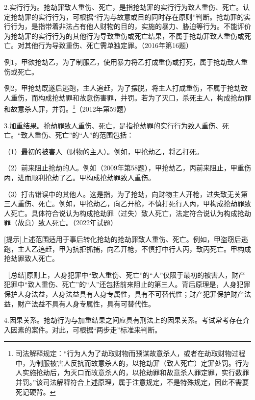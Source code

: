 2.实行行为。抢劫罪致人重伤、死亡，是指抢劫罪的实行行为致人重伤、死亡。认定抢劫罪的实行行为，可根据“行为与故意或目的同时存在原则”判断。抢劫罪的实行行为，是指带着非法占有他人财物的目的，实施的暴力、胁迫等行为。不能评价为抢劫罪的实行行为的其他行为导致重伤或死亡结果，不属于抢劫罪致人重伤或死亡。对其他行为导致重伤、死亡需单独定罪。（2016年第16题）

例1，甲欲抢劫乙，为了制服乙，使用暴力将乙打成重伤或打死，属于抢劫致人重伤或死亡。

例2，甲抢劫既遂后逃跑，主人追赶，为了摆脱，将主人打成重伤，不属于抢劫致人重伤，而构成抢劫罪和故意伤害罪，并罚。若为了灭口，杀死主人，构成抢劫罪和故意杀人罪，并罚。\footnote{司法解释规定：“行为人为了劫取财物而预谋故意杀人，或者在劫取财物过程中，为制服被害人反抗而故意杀人的，以抢劫罪（致人死亡）定罪处罚。行为人实施抢劫后，为灭口而故意杀人的，以抢劫罪和故意杀人罪定罪，实行数罪并罚。”该司法解释符合上述原理，属于注意规定，不是特殊规定，因此不需要死记硬背。}（2012年第59题）

3.加重结果。抢劫罪致人重伤、死亡，是指抢劫罪的实行行为致人重伤、死亡。“致人重伤、死亡”的“人”的范围包括：

（1）最初的被害人（财物的主人）。例如，甲抢劫乙，将乙打死。

（2）前来阻止抢劫的人。例如（2009年第58题），甲抢劫乙，丙前来阻止，甲重伤丙，进而顺利抢劫了乙。甲构成抢劫罪致人重伤。

（3）打击错误中的其他人。这是指，为了抢劫，向财物主人开枪，过失致无关第三人重伤、死亡。例如，甲抢劫乙，向乙开枪，不慎打死行人丙，甲构成抢劫罪致人死亡。具体符合说认为构成抢劫罪（过失）致人死亡，法定符合说认为构成抢劫罪（故意）致人死亡。（2022年试题）

[提示]上述范围适用于事后转化抢劫的抢劫罪致人重伤、死亡。例如，甲盗窃后逃跑，主人乙追赶，甲为抗拒抓捕，向乙开枪，不慎打中行人丙，致丙死亡。甲构成抢劫罪致人死亡。


［总结]原则上，人身犯罪中“致人重伤、死亡”的“人”仅限于最初的被害人，财产犯罪中“致人重伤、死亡”的“人”还包括前来阻止的第三人。背后原理是，人身犯罪保护人身法益，人身法益具有人身专属性，具有不可替代性；财产犯罪保护财产法益，财产法益不具有人身专属性，具有可替代性。

4.因果关系。抢劫行为与加重结果之间应具有刑法上的因果关系。考试常考存在介入因素的案件。对此，可根据“两步走”标准来判断。

